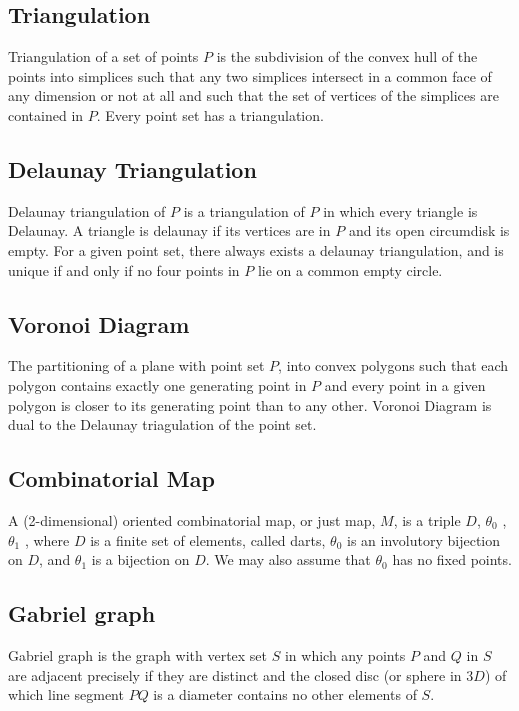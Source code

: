 \documentclass[preprint,5p,times,twocolumn]{elsarticle}
\begin{document}
\subsection{Triangulation}
Triangulation of a set of points $P$ is the subdivision of the convex hull of the points into simplices such that any two simplices intersect in a common face of any dimension or not at all and such that the set of vertices of the simplices are contained in $P$. Every point set has a triangulation. 

\subsection{Delaunay Triangulation}
Delaunay triangulation of $P$ is a triangulation of $P$ in which every triangle is Delaunay. A triangle is delaunay if its vertices are in $P$ and its open circumdisk is empty. For a given point set, there always exists a delaunay triangulation, and is unique if and only if no four points in $P$ lie on a common empty circle.

\subsection{Voronoi Diagram}
The partitioning of a plane with point set $P$, into convex polygons such that each polygon contains exactly one generating point in $P$ and every point in a given polygon is closer to its generating point than to any other. Voronoi Diagram is dual to the Delaunay triagulation of the point set.

\subsection{Combinatorial Map}
A (2-dimensional) oriented combinatorial map, or just map, $M$, is a triple $D$, $\theta_0$ , $\theta_1$ , where $D$ is a finite set of elements, called darts, $\theta_0$ is an involutory bijection on $D$, and $\theta_1$ is a bijection on $D$. We may also assume that $\theta_0$ has no fixed points.

\subsection{Gabriel graph}
Gabriel graph is the graph with vertex set $S$ in which any points $P$ and $Q$ in $S$ are adjacent precisely if they are distinct and the closed disc (or sphere in $3D$) of which line segment $PQ$ is a diameter contains no other elements of $S$.
\end{document}
